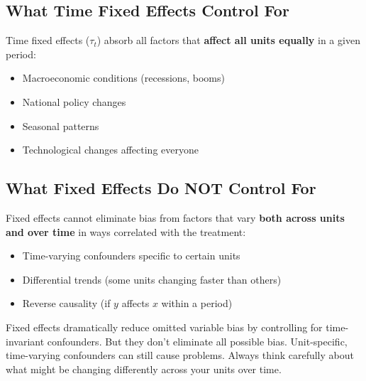 \documentclass[
  letterpaper,
  DIV=11,
  numbers=noendperiod]{scrreprt}
\providecommand{\tightlist}{%
  \setlength{\itemsep}{0pt}\setlength{\parskip}{0pt}}
\begin{document}
\subsection{What Time Fixed Effects Control
For}\label{what-time-fixed-effects-control-for}

Time fixed effects (\(\tau_t\)) absorb all factors that \textbf{affect
all units equally} in a given period:

\begin{itemize}
\tightlist
\item
  Macroeconomic conditions (recessions, booms)
\item
  National policy changes
\item
  Seasonal patterns
\item
  Technological changes affecting everyone
\end{itemize}

\subsection{What Fixed Effects Do NOT Control
For}\label{what-fixed-effects-do-not-control-for}

Fixed effects cannot eliminate bias from factors that vary \textbf{both
across units and over time} in ways correlated with the treatment:

\begin{itemize}
\tightlist
\item
  Time-varying confounders specific to certain units
\item
  Differential trends (some units changing faster than others)
\item
  Reverse causality (if \(y\) affects \(x\) within a period)
\end{itemize}

\begin{tcolorbox}[enhanced jigsaw, arc=.35mm, bottomrule=.15mm, bottomtitle=1mm, breakable, colback=white, colbacktitle=quarto-callout-warning-color!10!white, colframe=quarto-callout-warning-color-frame, coltitle=black, left=2mm, leftrule=.75mm, opacityback=0, opacitybacktitle=0.6, rightrule=.15mm, title=\textcolor{quarto-callout-warning-color}{\faExclamationTriangle}\hspace{0.5em}{Fixed Effects ≠ No OVB}, titlerule=0mm, toprule=.15mm, toptitle=1mm]

Fixed effects dramatically reduce omitted variable bias by controlling
for time-invariant confounders. But they don't eliminate all possible
bias. Unit-specific, time-varying confounders can still cause problems.
Always think carefully about what might be changing differently across
your units over time.

\end{tcolorbox}
\end{document}
